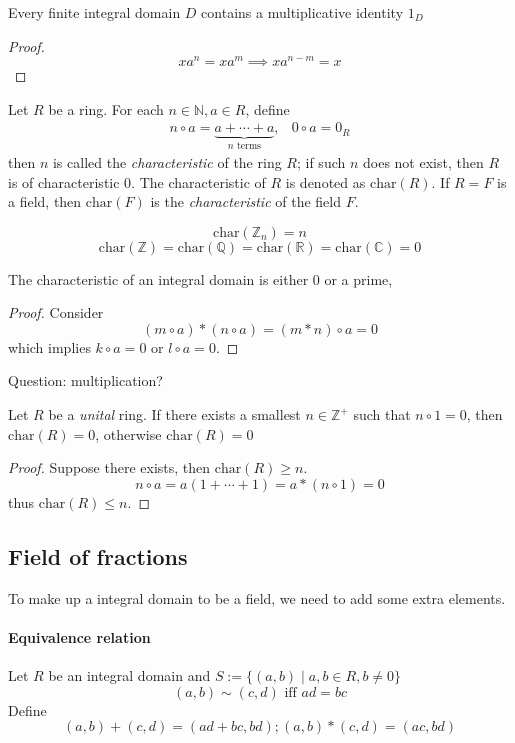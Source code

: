\begin{proposition}
Every finite integral domain $D$ contains a multiplicative identity $1_D$
\end{proposition}
\begin{proof}
\[
xa^n=xa^m\implies xa^{n-m}=x
\]
\end{proof}
\begin{definition}[Characteristic]
Let $R$ be a ring. For each $n\in\mathbb{N},a\in R$, define
\[
\begin{array}{ll}
n\circ a=\underbrace{a+\cdots+a}_{\text{$n$ terms}},
&
0\circ a = 0_R
\end{array}
\]
then $n$ is called the \emph{characteristic} of the ring $R$; if such $n$ does not exist, then $R$ is of characteristic $0$. The characteristic of $R$ is denoted as $\mbox{char}(R)$. If $R=F$ is a field, then $\mbox{char}(F)$ is the \emph{characteristic} of the field $F$.
\end{definition}
\begin{example}
\[
\mbox{char}(\mathbb{Z}_n)=n
\]
\[
\mbox{char}(\mathbb{Z})=\mbox{char}(\mathbb{Q})=\mbox{char}(\mathbb{R})=\mbox{char}(\mathbb{C})=0
\]
\end{example}
\begin{proposition}
The characteristic of an integral domain is either 0 or a prime,
\end{proposition}
\begin{proof}
Consider 
\[
(m\circ a)*(n\circ a)=(m*n)\circ a=0
\]
which implies $k\circ a=0$ or $l\circ a=0$.
\end{proof}
Question: multiplication?


\begin{theorem}
Let $R$ be a \emph{unital} ring. If there exists a smallest $n\in\mathbb{Z}^+$ such that $n\circ 1=0$, then $\mbox{char}(R)=0$, otherwise $\mbox{char}(R)=0$
\end{theorem}
\begin{proof}
Suppose there exists, then $\mbox{char}(R)\ge n$.
\[
n\circ a=a(1+\cdots+1)=a*(n\circ1)=0
\]
thus $\mbox{char}(R)\le n$.
\end{proof}

\subsection{Field of fractions}
To make up a integral domain to be a field, we need to add some extra elements.
\paragraph{Equivalence relation}
Let $R$ be an integral domain and $S:=\{(a,b)\mid a,b\in R,b\ne0\}$
\[
(a,b)\sim(c,d)\mbox{ iff }ad=bc
\]
Define
\[
(a,b)+(c,d)=(ad+bc,bd);(a,b)*(c,d)=(ac,bd)
\]

